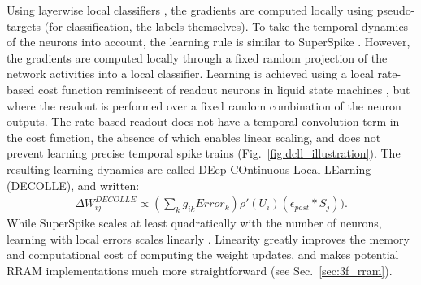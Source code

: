 \documentclass[english]{article}
\newcommand{\reffig}[1]{{Fig.~\ref{#1}}}
\newcommand{\refsec}[1]{{Sec.~\ref{#1}}}
\renewcommand{\cite}{\citep}
\begin{document}
Using layerwise local classifiers \cite{Mostafa_etal17_deepsupe}, the gradients are computed locally using pseudo-targets (for classification, the labels themselves). 
To take the temporal dynamics of the neurons into account, the learning rule is similar to SuperSpike \cite{Zenke_Ganguli17_supesupe}. However, the gradients are computed locally through a fixed random projection of the network activities into a local classifier. 
Learning is achieved using a local rate-based cost function reminiscent of readout neurons in liquid state machines \cite{Maass_etal02_realcomp}, but where the readout is performed over a fixed random combination of the neuron outputs.
The rate based readout does not have a temporal convolution term in the cost function, the absence of which enables linear scaling, and does not prevent learning precise temporal spike trains (\reffig{fig:dcll_illustration}). The resulting learning dynamics are called DEep COntinuous Local LEarning (DECOLLE), and written:
\begin{align}\label{eq:dcll_rule}
  \Delta W_{ij}^{DECOLLE} \propto  (\sum_k g_{ik} Error_k) \rho'(U_i) (\epsilon_{post} \ast S_j)).
\end{align}
While SuperSpike scales at least quadratically with the number of neurons, learning with local errors scales linearly \cite{Kaiser_etal18_synaplas}. 
Linearity greatly improves the memory and computational cost of computing the weight updates, and makes potential RRAM implementations much more straightforward (see \refsec{sec:3f_rram}).
%
\end{document}
